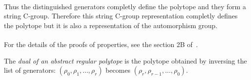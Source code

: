 \paragraph{}
Thus the distinguished generators completly define the polytope and they form a string C-group. Therefore this string C-group representation completly defines the polytope but it is also a representation of the automorphism group.

\paragraph{}
For the details of the proofs of properties, see the section 2B of~\cite{abstractRegularPolytopes}.

\begin{definition}
  The \textit{dual of an abstract regular polytope} is the polytope obtained by inversing the list of generators: $(\rho_0, \rho_1, \dots, \rho_r)$ becomes $(\rho_r, \rho_{r-1}, \dots, \rho_0)$.
\end{definition}
